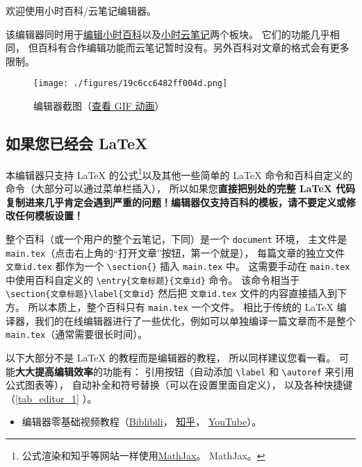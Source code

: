 
欢迎使用小时百科/云笔记编辑器。

该编辑器同时用于\href{https://wuli.wiki/editor/}{编辑小时百科}以及\href{https://wuli.wiki/note/}{小时云笔记}两个板块。 它们的功能几乎相同， 但百科有合作编辑功能而云笔记暂时没有。另外百科对文章的格式会有更多限制。
\begin{figure}[ht]
\centering
\texttt{[image: ./figures/19c6cc6482ff004d.png]}
\caption{编辑器截图（\href{https://wuli.wiki/apps/editor.gif}{查看 GIF 动画}）} \label{fig_editor_3}
\end{figure}

\subsection{如果您已经会 LaTeX}
本编辑器只支持 LaTeX 的公式\footnote{公式渲染和知乎等网站一样使用\href{https://www.mathjax.org/}{MathJax}。 MathJax。}以及其他一些简单的 LaTeX 命令和百科自定义的命令（大部分可以通过菜单栏插入）， 所以如果您\textbf{直接把别处的完整 LaTeX 代码复制进来几乎肯定会遇到严重的问题！编辑器仅支持百科的模板，请不要定义或修改任何模板设置！}

整个百科（或一个用户的整个云笔记，下同）是一个 \verb|document| 环境， 主文件是 \verb|main.tex|（点击右上角的“打开文章”按钮，第一个就是）， 每篇文章的独立文件 \verb|文章id.tex| 都作为一个 \verb|\section{}| 插入 \verb|main.tex| 中。 这需要手动在 \verb|main.tex| 中使用百科自定义的 \verb|\entry{文章标题}{文章id}| 命令。 该命令相当于 \verb|\section{文章标题}\label{文章id}| 然后把 \verb|文章id.tex| 文件的内容直接插入到下方。 所以本质上，整个百科只有 \verb|main.tex| 一个文件。 相比于传统的 LaTeX 编译器，我们的在线编辑器进行了一些优化，例如可以单独编译一篇文章而不是整个 \verb`main.tex`（通常需要很长时间）。

以下大部分不是 LaTeX 的教程而是编辑器的教程， 所以同样建议您看一看。 可能\textbf{大大提高编辑效率}的功能有： 引用按钮（自动添加 \verb|\label| 和 \verb|\autoref| 来引用公式图表等）， 自动补全和符号替换（可以在设置里面自定义）， 以及各种快捷键（\autoref{tab_editor_1} ）。

\begin{itemize}
\item 编辑器零基础视频教程（\href{https://www.bilibili.com/video/av87698355/}{Biblibili}， \href{https://zhuanlan.zhihu.com/p/105869878}{知乎}， \href{https://www.youtube.com/watch?v=AN2tXNanD9U&t=1s}{YouTube}）。
\end{itemize}

